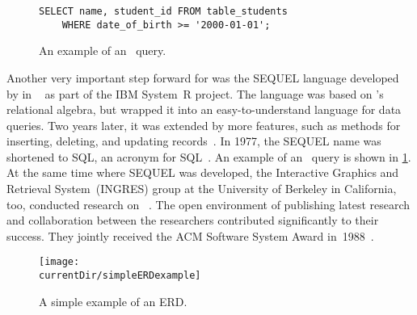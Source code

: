 \begin{figure}%
\centering%
%
\lstset{style=sql_style,showspaces=False}%
\begin{lstlisting}
SELECT name, student_id FROM table_students
    WHERE date_of_birth >= '2000-01-01';
\end{lstlisting}
\endminipage%
\caption{An example of an \sql\ query.}%
\label{fig:sqlQueryExample}%
\end{figure}%

Another very important step forward for  was the SEQUEL language developed by \citeauthor{CB1974SASEQL} in \citeyear{CB1974SASEQL}~\cite{CB1974SASEQL} as part of the IBM System~R project.
The language was based on \citeauthor{C1970ARMODFLSDB}'s relational algebra, but wrapped it into an easy-to-understand language for data queries.
Two years later, it was extended by more features, such as methods for inserting, deleting, and updating records~\cite{CAEGLMRB1976S2AUATDDMAC}.
In 1977, the SEQUEL name was shortened to \acrshort{SQL}, an acronym for \acrfull{SQL}~\cite{C20245YOQ}.
An example of an \sql\ query is shown in \cref{fig:sqlQueryExample}.
At the same time where SEQUEL was developed, the Interactive Graphics and Retrieval System~(INGRES) group at the University of Berkeley in California, too, conducted research on ~\cite{S1986TIPAOARDS}.
The open environment of publishing latest research and collaboration between the researchers contributed significantly to their success.
They jointly received the ACM Software System Award in~1988~\cite{C20245YOQ}.

\begin{figure}%
\centering%
\texttt{[image: \\currentDir/simpleERDexample]}%
\caption{A simple example of an \gls{ERD}.}%
\label{fig:simpleERDexample}%
\end{figure}%

